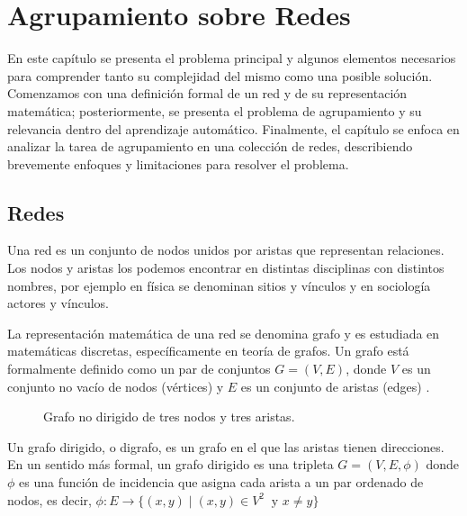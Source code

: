 
\chapter{Agrupamiento sobre Redes} %
\label{chapter:2}


En este capítulo se presenta el problema principal y algunos elementos necesarios para comprender tanto su complejidad del mismo como una posible solución. Comenzamos con una definición formal de un red  y de su representación matemática; posteriormente, se presenta el problema de agrupamiento y su relevancia dentro del aprendizaje automático. Finalmente, el capítulo se enfoca en analizar la tarea de agrupamiento en una colección de redes, describiendo brevemente enfoques y limitaciones para resolver el problema. 

\section{Redes}

Una red es un conjunto de nodos unidos por aristas que representan relaciones. Los nodos y aristas los podemos encontrar en distintas disciplinas con distintos nombres, por ejemplo en física se denominan sitios y vínculos y en sociología actores y vínculos. 

La representación matemática de una red se denomina grafo y es estudiada en matemáticas discretas, específicamente en teoría de grafos. Un grafo está formalmente definido como un par de conjuntos $G = (V,E)$, donde $V$ es un conjunto no vacío de nodos (vértices) y $E$ es un conjunto de aristas (edges) \cite{saoub_graph_2021}.

 \begin{figure}[htbp]
   \centering
   
    \caption{Grafo no dirigido de tres nodos y tres aristas.}
    \label{fig:graph}
\end{figure}

Un grafo dirigido, o digrafo, es un grafo en el que las aristas tienen direcciones. En un sentido más formal, un grafo dirigido es una tripleta $G = (V,E,\phi)$ donde $\phi$ es una función de incidencia que asigna cada arista a un par ordenado de nodos, es decir, $ \phi :E \to \{(x,y)\mid (x,y)\in V^{2}\ \mbox{ y } x \neq y \}$

